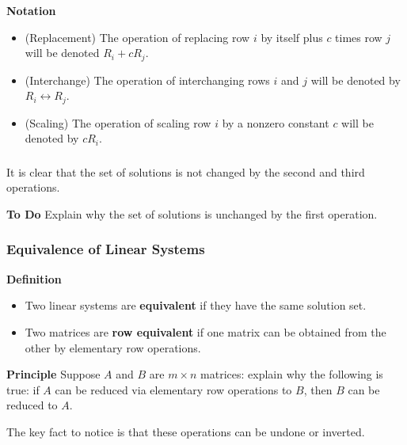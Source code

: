   \begin{frame}[fragile]\frametitle{}
\textbf{Notation}
\begin{itemize}
\item (Replacement) The operation of replacing row $i$ by itself plus  $c$ times row $j$ will be denoted $R_i + cR_j$.
\item (Interchange)  The operation of interchanging rows $i$ and $j$ will be denoted by $R_i \leftrightarrow R_j$.
\item (Scaling) The operation of scaling row $i$ by a nonzero constant $c$ will be denoted by $cR_i$.
\end{itemize}


\end{frame}


  \begin{frame}[fragile]\frametitle{}

It is clear that the set of solutions is not changed by the second and third operations.  



\textbf{To Do}
 Explain why the set of solutions is unchanged by the first operation.



\end{frame}

  \begin{frame}[fragile]\frametitle{Equivalence of Linear Systems}
\textbf{Definition}
\begin{itemize}
 \item Two linear systems are \textbf{equivalent} if they have the same solution set.
 \item Two matrices are \textbf{row equivalent} if one matrix can be obtained from the other
 by elementary row operations.
\end{itemize}



\textbf{Principle}  Suppose $A$ and $B$ are $m \times n$ matrices: explain why the following 
 is true: if $A$ can be reduced via elementary row operations to $B$, then $B$ can be reduced
 to $A$. 
 



The key fact to notice is that these operations can be undone or inverted.

\end{frame}

